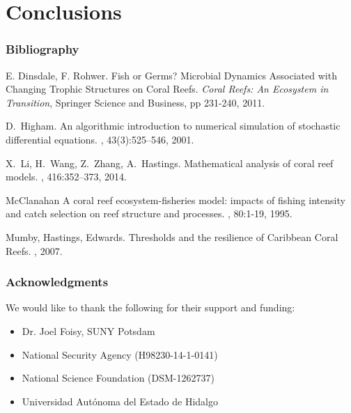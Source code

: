 
\section{Conclusions}



\begin{frame}
  \frametitle{Bibliography}
{\small
 \begin{thebibliography}{1}
 
   E. Dinsdale, F. Rohwer.
   \newblock Fish or Germs? Microbial Dynamics Associated with Changing Trophic Structures on Coral Reefs.
   \newblock \emph{Coral Reefs: An Ecosystem in Transition}, Springer Science and Business, pp 231-240, 2011.

   D.~Higham.
   \newblock An algorithmic introduction to numerical simulation of stochastic
   differential equations.
   , 43(3):525--546, 2001.

   X.~Li, H.~Wang, Z.~Zhang, A.~Hastings.
   \newblock Mathematical analysis of coral reef models.
   , 416:352--373, 2014.

    McClanahan
    \newblock A coral reef ecosystem-fisheries model: impacts of fishing intensity and catch selection on reef structure and processes.
    , 80:1-19, 1995.

    Mumby, Hastings, Edwards.
    \newblock Thresholds and the resilience of Caribbean Coral Reefs.
    , 2007.
  \end{thebibliography}
  }
\end{frame}

\begin{frame}
  \frametitle{Acknowledgments}
  
  We would like to thank the following for their support and funding: 
  
 \begin{itemize}
 \item Dr. Joel Foisy, SUNY Potsdam
 \item National Security Agency (H98230-14-1-0141)
 \item National Science Foundation (DSM-1262737)
 \item Universidad Aut\'onoma del Estado de Hidalgo
 \end{itemize}
\end{frame}


